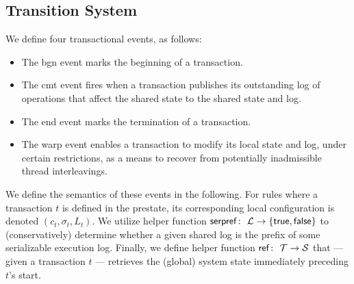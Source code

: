 \subsection{Transition System}

We define four transactional events, as follows:
\begin{itemize}
\item The {\sf bgn} event marks the beginning of a transaction.
\item The {\sf cmt} event fires when a transaction publishes its outstanding log of operations that affect the shared state to the shared state and log.
\item The {\sf end} event marks the termination of a transaction.
\item The {\sf warp} event enables a transaction to modify its local state and log, under certain restrictions, as a means to recover from potentially inadmissible thread interleavings.
\end{itemize}
We define the semantics of these events in the following. For rules where a transaction $t$ is defined in the prestate, its corresponding local configuration is denoted $(c_t,\sigma_t,L_t)$. We utilize helper function ${\sf serpref} \colon\ {\cal L} \rightarrow \{ {\sf true},{\sf false} \}$ to (conservatively) determine whether a given shared log is the prefix of some serializable execution log. Finally, we define helper function
${\sf ref} \colon\ {\cal T} \rightarrow {\cal S}$ that --- given a transaction $t$ --- retrieves the (global) system state immediately preceding $t$'s start.

